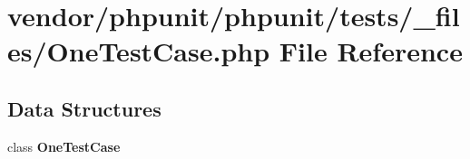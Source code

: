\section{vendor/phpunit/phpunit/tests/\+\_\+files/\+One\+Test\+Case.php File Reference}
\label{_one_test_case_8php}
\subsection*{Data Structures}
\begin{DoxyCompactItemize}
\item 
class {\bf One\+Test\+Case}
\end{DoxyCompactItemize}
